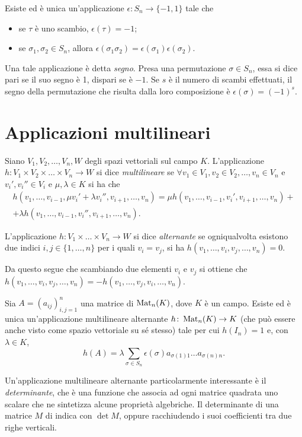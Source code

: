 \begin{proprieta} \label{pr:segno}
	Esiste ed è unica un'applicazione $\epsilon\colon S_n\to\{-1,1\}$ tale che
	\begin{itemize}
		\item se $\tau$ è uno scambio, $\epsilon(\tau)=-1$;
		\item se $\sigma_1,\sigma_2\in S_n$, allora $\epsilon(\sigma_1\sigma_2)=\epsilon(\sigma_1)\epsilon(\sigma_2)$.
	\end{itemize}
\end{proprieta}
Una tale applicazione è detta \emph{segno}.
Presa una permutazione $\sigma\in S_n$, essa si dice pari se il suo segno è 1, dispari se è $-1$.
Se $s$ è il numero di scambi effettuati, il segno della permutazione che risulta dalla loro composizione è $\epsilon(\sigma)=(-1)^s$.

\section{Applicazioni multilineari}
\begin{definizione} \label{d:applicazione-multilineare}
	Siano $V_1,V_2,\dots,V_n,W$ degli spazi vettoriali sul campo $K$.
	L'applicazione $h\colon V_1\times V_2\times\dots\times V_n\to W$ si dice \emph{multilineare} se $\forall v_1\in V_1,v_2\in V_2,\dots,v_n\in V_n$ e $v_i',v_i''\in V_i$ e $\mu,\lambda\in K$ si ha che
	\begin{multline*}
		h(v_1,\dots,v_{i-1},\mu v_i'+\lambda v_i'',v_{i+1},\dots,v_n)=\mu h(v_1,\dots,v_{i-1},v_i',v_{i+1},\dots,v_n)+\\+\lambda h(v_1,\dots,v_{i-1},v_i'',v_{i+1},\dots,v_n).
	\end{multline*}
\end{definizione}
\begin{definizione} \label{d:applicazione-multilineare-alternante}
	L'applicazione $h\colon V_1\times\dots\times V_n\to W$ si dice \emph{alternante} se ogniqualvolta esistono due indici $i,j\in\{1,\dots,n\}$ per i quali $v_i=v_j$, si ha $h(v_1,\dots,v_i,v_j,\dots,v_n)=0$.
\end{definizione}
Da questo segue che scambiando due elementi $v_i$ e $v_j$ si ottiene che $h(v_1,\dots,v_i,v_j,\dots,v_n)=-h(v_1,\dots,v_j,v_i,\dots,v_n)$.
\begin{teorema}[di unicità] \label{t:unicita-applicazione-multilinare-alternante}
	Sia $A=(a_{ij})_{i,j=1}^n$ una matrice di $\operatorname{Mat}_n(K)$, dove $K$ è un campo.
	Esiste ed è unica un'applicazione multilineare alternante $h\colon\operatorname{Mat}_n(K)\to K$ (che può essere anche visto come spazio vettoriale su sé stesso) tale per cui $h(I_n)=1$ e, con $\lambda\in K$, 
	\begin{equation*}
		h(A)=\lambda\sum_{\sigma\in S_n}\epsilon(\sigma)a_{\sigma(1)1}\dots a_{\sigma(n)n}.
	\end{equation*}
\end{teorema}
Un'applicazione multilineare alternante particolarmente interessante è il \emph{determinante}, che è una funzione che associa ad ogni matrice quadrata uno scalare che ne sintetizza alcune proprietà algebriche.
Il determinante di una matrice $M$ di indica con $\det M$, oppure racchiudendo i suoi coefficienti tra due righe verticali.


